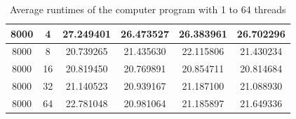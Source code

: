 \documentclass{article}
\begin{document}
\begin{table}[H]
{\begin{tabular}{|c|c|ccc|c|}
    8000                                                                                   & 4                                                                                       & \multicolumn{1}{c|}{27.249401}        & \multicolumn{1}{c|}{26.473527}       & 26.383961       & 26.702296                                                                                    \\ \hline
    8000                                                                                   & 8                                                                                       & \multicolumn{1}{c|}{20.739265}        & \multicolumn{1}{c|}{21.435630}       & 22.115806       & 21.430234                                                                                    \\ \hline
    8000                                                                                   & 16                                                                                      & \multicolumn{1}{c|}{20.819450}        & \multicolumn{1}{c|}{20.769891}       & 20.854711       & 20.814684                                                                                    \\ \hline
    8000                                                                                   & 32                                                                                      & \multicolumn{1}{c|}{21.140523}        & \multicolumn{1}{c|}{20.939167}       & 21.187100       & 21.088930                                                                                    \\ \hline
    8000                                                                                   & 64                                                                                      & \multicolumn{1}{c|}{22.781048}        & \multicolumn{1}{c|}{20.981064}       & 21.185897       & 21.649336                                                                                    \\ \hline
    \end{tabular}}
    \caption{\label{table}Average runtimes of the computer program with 1 to 64 threads}
    \end{table}
\end{document}
